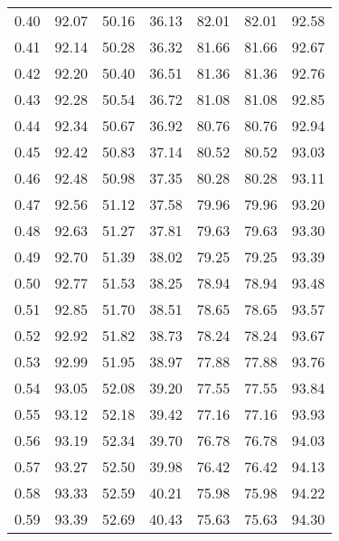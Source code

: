 \begin{tabular}{|c|c|c|c|c|c|c|}
      0.40 &     92.07 &     50.16 &      36.13 &   82.01 &      82.01 &         92.58 \\
      0.41 &     92.14 &     50.28 &      36.32 &   81.66 &      81.66 &         92.67 \\
      0.42 &     92.20 &     50.40 &      36.51 &   81.36 &      81.36 &         92.76 \\
      0.43 &     92.28 &     50.54 &      36.72 &   81.08 &      81.08 &         92.85 \\
      0.44 &     92.34 &     50.67 &      36.92 &   80.76 &      80.76 &         92.94 \\
      0.45 &     92.42 &     50.83 &      37.14 &   80.52 &      80.52 &         93.03 \\
      0.46 &     92.48 &     50.98 &      37.35 &   80.28 &      80.28 &         93.11 \\
      0.47 &     92.56 &     51.12 &      37.58 &   79.96 &      79.96 &         93.20 \\
      0.48 &     92.63 &     51.27 &      37.81 &   79.63 &      79.63 &         93.30 \\
      0.49 &     92.70 &     51.39 &      38.02 &   79.25 &      79.25 &         93.39 \\
      0.50 &     92.77 &     51.53 &      38.25 &   78.94 &      78.94 &         93.48 \\
      0.51 &     92.85 &     51.70 &      38.51 &   78.65 &      78.65 &         93.57 \\
      0.52 &     92.92 &     51.82 &      38.73 &   78.24 &      78.24 &         93.67 \\
      0.53 &     92.99 &     51.95 &      38.97 &   77.88 &      77.88 &         93.76 \\
      0.54 &     93.05 &     52.08 &      39.20 &   77.55 &      77.55 &         93.84 \\
      0.55 &     93.12 &     52.18 &      39.42 &   77.16 &      77.16 &         93.93 \\
      0.56 &     93.19 &     52.34 &      39.70 &   76.78 &      76.78 &         94.03 \\
      0.57 &     93.27 &     52.50 &      39.98 &   76.42 &      76.42 &         94.13 \\
      0.58 &     93.33 &     52.59 &      40.21 &   75.98 &      75.98 &         94.22 \\
      0.59 &     93.39 &     52.69 &      40.43 &   75.63 &      75.63 &         94.30 \\

\end{tabular}
